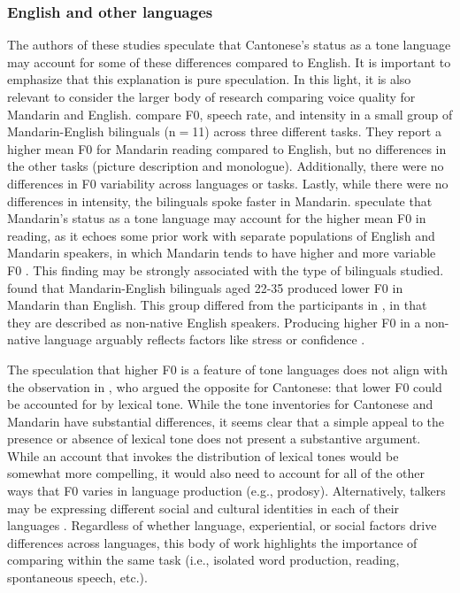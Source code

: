 \subsubsection{English and other languages}

The authors of these studies speculate that Cantonese's status as a tone language may account for some of these differences compared to English. It is important to emphasize that this explanation is pure speculation. In this light, it is also relevant to consider the larger body of research comparing voice quality for Mandarin and English. \citet{lee_2017_bilingual} compare F0, speech rate, and intensity in a small group of Mandarin-English bilinguals (n$=$11) across three different tasks. They report a higher mean F0 for Mandarin reading compared to English, but no differences in the other tasks (picture description and monologue). Additionally, there were no differences in F0 variability across languages or tasks. Lastly, while there were no differences in intensity, the bilinguals spoke faster in Mandarin. \citet{lee_2017_bilingual} speculate that Mandarin's status as a tone language may account for the higher mean F0 in reading, as it echoes some prior work with separate populations of English and Mandarin speakers, in which Mandarin tends to have higher and more variable F0 \citep{keating_2012_f0}. This finding may be strongly associated with the type of bilinguals studied. \citet{xue_2002_f0} found that Mandarin-English bilinguals aged 22-35 produced lower F0 in Mandarin than English. This group differed from the participants in \citet{lee_2017_bilingual}, in that they are described as non-native English speakers. Producing higher F0 in a non-native language arguably reflects factors like stress or confidence \citep{jarvinen_2013_speaking, lee_2017_bilingual}.

The speculation that higher F0 is a feature of tone languages does not align with the observation in \citet{ng_2012_ltas}, who argued the opposite for Cantonese: that lower F0 could be accounted for by lexical tone. While the tone inventories for Cantonese and Mandarin have substantial differences, it seems clear that a simple appeal to the presence or absence of lexical tone does not present a substantive argument. While an account that invokes the distribution of lexical tones would be somewhat more compelling, it would also need to account for all of the other ways that F0 varies in language production (e.g., prodosy). Alternatively, talkers may be expressing different social and cultural identities in each of their languages \citep{loveday_1981_pitch, voigt_2016_between}. Regardless of whether language, experiential, or social factors drive differences across languages, this body of work highlights the importance of comparing within the same task (i.e., isolated word production, reading, spontaneous speech, etc.). 

